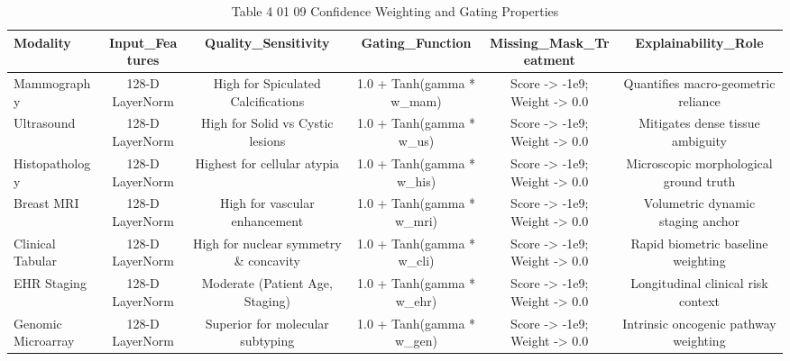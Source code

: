 \begin{table}[htbp]
\centering
\small
\begin{tabular}{lccccc}
\hline
Modality & Input\_Features & Quality\_Sensitivity & Gating\_Function & Missing\_Mask\_Treatment & Explainability\_Role \\
\hline
Mammography & 128-D LayerNorm & High for Spiculated Calcifications & 1.0 + Tanh(gamma * w\_mam) & Score -> -1e9; Weight -> 0.0 & Quantifies macro-geometric reliance \\
Ultrasound & 128-D LayerNorm & High for Solid vs Cystic lesions & 1.0 + Tanh(gamma * w\_us) & Score -> -1e9; Weight -> 0.0 & Mitigates dense tissue ambiguity \\
Histopathology & 128-D LayerNorm & Highest for cellular atypia & 1.0 + Tanh(gamma * w\_his) & Score -> -1e9; Weight -> 0.0 & Microscopic morphological ground truth \\
Breast MRI & 128-D LayerNorm & High for vascular enhancement & 1.0 + Tanh(gamma * w\_mri) & Score -> -1e9; Weight -> 0.0 & Volumetric dynamic staging anchor \\
Clinical Tabular & 128-D LayerNorm & High for nuclear symmetry \& concavity & 1.0 + Tanh(gamma * w\_cli) & Score -> -1e9; Weight -> 0.0 & Rapid biometric baseline weighting \\
EHR Staging & 128-D LayerNorm & Moderate (Patient Age, Staging) & 1.0 + Tanh(gamma * w\_ehr) & Score -> -1e9; Weight -> 0.0 & Longitudinal clinical risk context \\
Genomic Microarray & 128-D LayerNorm & Superior for molecular subtyping & 1.0 + Tanh(gamma * w\_gen) & Score -> -1e9; Weight -> 0.0 & Intrinsic oncogenic pathway weighting \\
\hline
\end{tabular}
\caption{Table 4 01 09 Confidence Weighting and Gating Properties}
\label{tab:table_4_01_09_confidence_weighting_and_gating_properties}
\end{table}
